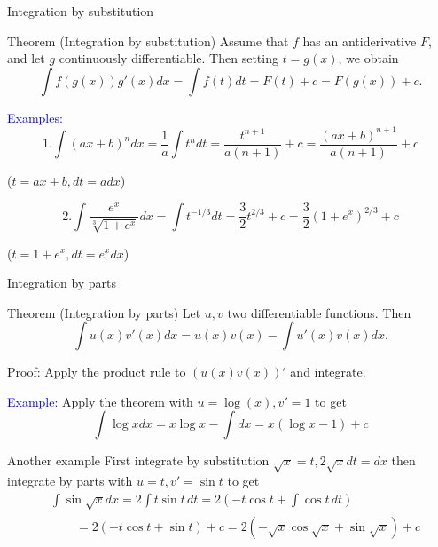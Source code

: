 \documentclass[11pt,aspectratio=169]{beamer}
\begin{document}
\begin{frame}{Integration by substitution}
\begin{block}{Theorem (Integration by substitution)}
Assume that $f$ has an antiderivative $F$, and let $g$  continuously differentiable.
Then setting $t=g(x)$, we obtain 
$$
\int f(g(x)) g'(x) dx=\int f(t) dt=F(t)+c=F(g(x))+c.
$$	
\end{block}
 \textcolor{blue}{Examples:}
$$
1. \int (ax+b)^n dx= \frac{1}{a} \int t^n dt=\frac{t^{n+1}}{a(n+1)}+c=\frac{(ax+b)^{n+1}}{a(n+1)}+c 
$$

\begin{tiny} ($t=ax+b, dt=adx$)\end{tiny}

$$
2. \int \frac{e^x}{\sqrt[3]{1+e^x}} dx=\int t^{-1/3} dt=\frac{3}{2} t^{2/3}+c=
\frac32 (1+e^x)^{2/3}+c 
$$
 \begin{tiny} ($t=1+e^x, dt=e^x dx$)\end{tiny}
\end{frame}

\begin{frame}{Integration by parts}
\begin{block}{Theorem (Integration by parts)}
Let $u,v$ two differentiable functions. Then
$$
 \int u(x)v'(x) dx=u(x)v(x)- \int u'(x)v(x) dx.
$$	
\vspace{-5mm}\begin{tiny}Proof: Apply the product  rule to $(u(x)v(x))'$ and integrate. \end{tiny}
\end{block}
\bigskip 

\textcolor{blue}{Example:} Apply the theorem with $u=\log(x), v'=1$ to get 
	$$
\int \log x dx=x \log x-\int dx=x(\log x -1) +c 
 $$
 \end{frame}

\begin{frame}{Another example}
First integrate by substitution $\sqrt{x}=t, 2 \sqrt{x} dt=dx$ then integrate by parts with $u=t, v'=\sin t$ to get
\begin{equation*} \begin{split}
&\int \sin \sqrt{x} dx=2 \int t \sin t \, dt= 2 (-t\cos t +\int \cos t \, dt)\\
&\qquad =2(-t\cos t+\sin t) +c =2(-\sqrt{x} \cos \sqrt{x}+\sin \sqrt{x})+c
 \end{split}
 \end{equation*}	
\end{frame}
\end{document}
